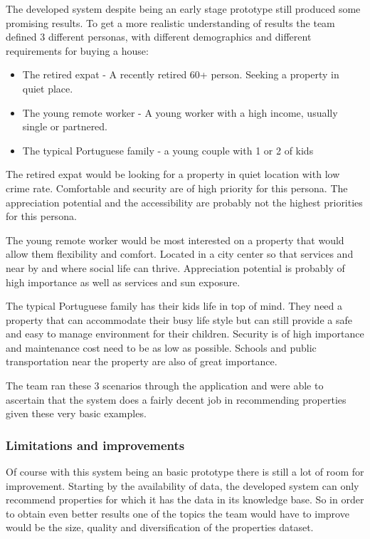 \documentclass[runningheads]{llncs}
\begin{document}
The developed system despite being an early stage prototype still produced some promising results. To get a more realistic understanding of results the team defined 3 different personas, with different demographics and different requirements for buying a house:

\begin{itemize}
    \item The retired expat - A recently retired 60+ person. Seeking a property in quiet place.
    \item The young remote worker - A young worker with a high income, usually single or partnered.
    \item The typical Portuguese family - a young couple with 1 or 2 of kids
\end{itemize}

The retired expat would be looking for a property in quiet location with low crime rate. Comfortable and security are of high priority for this persona. The appreciation potential and the accessibility are probably not the highest priorities for this persona.

The young remote worker would be most interested on a property that would allow them flexibility and comfort. Located in a city center so that services and near by and where social life can thrive. Appreciation potential is probably of high importance as well as services and sun exposure.

The typical Portuguese family has their kids life in top of mind. They need a property that can accommodate their busy life style but can still provide a safe and easy to manage environment for their children. Security is of high importance and maintenance cost need to be as low as possible. Schools and public transportation near the property are also of great importance.

The team ran these 3 scenarios through the application and were able to ascertain that the system does a fairly decent job in recommending properties given these very basic examples.

\subsubsection{Limitations and improvements} Of course with this system being an basic prototype there is still a lot of room for improvement. Starting by the availability of data, the developed system can only recommend properties for which it has the data in its knowledge base. So in order to obtain even better results one of the topics the team would have to improve would be the size, quality and diversification of the properties dataset.
\end{document}
